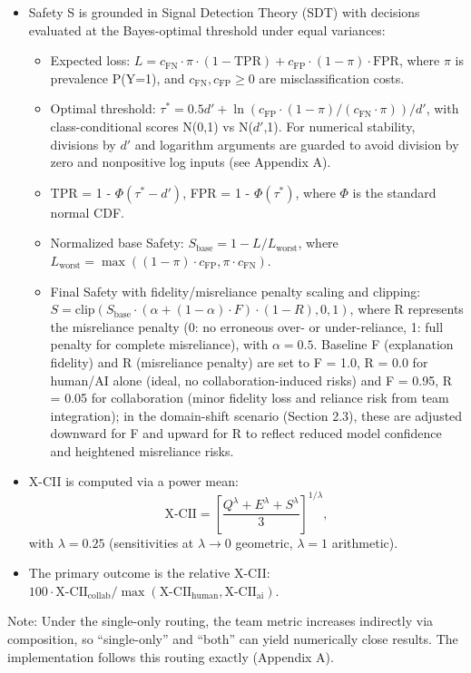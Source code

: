 \documentclass[11pt,a4paper]{article}
\begin{document}
\begin{itemize}
\item Safety S is grounded in Signal Detection Theory (SDT) with decisions evaluated at the Bayes-optimal threshold under equal variances:
  \begin{itemize}
  \item Expected loss: $L = c_{\text{FN}} \cdot \pi \cdot (1 - \text{TPR}) + c_{\text{FP}} \cdot (1 - \pi) \cdot \text{FPR}$, where $\pi$ is prevalence P(Y=1), and $c_{\text{FN}}, c_{\text{FP}} \geq 0$ are misclassification costs.
  \item Optimal threshold: $\tau^* = 0.5 d' + \ln(c_{\text{FP}} \cdot (1 - \pi) / (c_{\text{FN}} \cdot \pi)) / d'$, with class-conditional scores N(0,1) vs N($d'$,1). For numerical stability, divisions by $d'$ and logarithm arguments are guarded to avoid division by zero and nonpositive log inputs (see Appendix A).
  \item TPR = 1 - $\Phi(\tau^* - d')$, FPR = 1 - $\Phi(\tau^*)$, where $\Phi$ is the standard normal CDF.
  \item Normalized base Safety: $S_{\text{base}} = 1 - L / L_{\text{worst}}$, where $L_{\text{worst}} = \max((1 - \pi) \cdot c_{\text{FP}}, \pi \cdot c_{\text{FN}})$.
  \item Final Safety with fidelity/misreliance penalty scaling and clipping: $S = \text{clip}(S_{\text{base}} \cdot (\alpha + (1 - \alpha) \cdot F) \cdot (1 - R), 0, 1)$, where R represents the misreliance penalty (0: no erroneous over- or under-reliance, 1: full penalty for complete misreliance), with $\alpha = 0.5$. Baseline F (explanation fidelity) and R (misreliance penalty) are set to F = 1.0, R = 0.0 for human/AI alone (ideal, no collaboration-induced risks) and F = 0.95, R = 0.05 for collaboration (minor fidelity loss and reliance risk from team integration); in the domain-shift scenario (Section 2.3), these are adjusted downward for F and upward for R to reflect reduced model confidence and heightened misreliance risks.
  \end{itemize}
\item X-CII is computed via a power mean:
\[
\text{X-CII} = \left[ \frac{Q^\lambda + E^\lambda + S^\lambda}{3} \right]^{1/\lambda},
\]
with $\lambda = 0.25$ (sensitivities at $\lambda \to 0$ geometric, $\lambda = 1$ arithmetic).
\item The primary outcome is the relative X-CII: $100 \cdot \text{X-CII}_{\text{collab}} / \max(\text{X-CII}_{\text{human}}, \text{X-CII}_{\text{ai}})$.
\end{itemize}
Note: Under the single-only routing, the team metric increases indirectly via composition, so ``single-only'' and ``both'' can yield numerically close results. The implementation follows this routing exactly (Appendix A).
\end{document}
